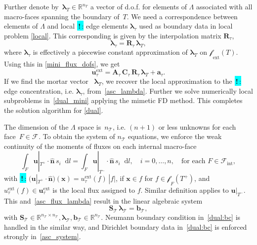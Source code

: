 \documentclass[12pt]{article}
\newcommand{\vect}[1]{\boldsymbol{\mathbf{#1}}}
\newcommand{\bcell}{T}
\newcommand{\bmesh}{{\vect{\mathcal T}}}
\newcommand{\mmesh}{{\vect{\mathcal \tau}}}
\newcommand{\bfaces}[1][]{{\vect{\mathcal F}_{\text{#1}}}}
\newcommand{\mfaces}[1][]{{\vect{\mathcal f}_{\text{#1}}}}
\newcommand{\Rn}[1]{{\mathbb R^{#1}}}
\newcommand{\toDiscuss}[1]{\colorbox{Cyan}{\textbf{\,!\,}:} #1}
\newcommand*\diff{\mathop{}\!\mathrm{d}}
\begin{document}
Further denote by~${{\vect \lambda}_\bcell \in \Rn{n_\bcell}}$ a vector of d.o.f. for elements of $\Lambda$ associated with all macro-faces spanning the boundary of~$\bcell$. We need a correspondence between elements of $\Lambda$ and local \toDiscuss{edge elements} $\vect \lambda_\mmesh$ used as boundary data in local problem \eqref{local}.
This corresponding is given by the interpolation matrix $ \vect R_\mmesh$,
\begin{equation}\label{asc_lambda}
	{\vect \lambda}_\mmesh = \vect R_\mmesh\,{\vect \lambda}_\bcell,
\end{equation}
where ${\vect \lambda}_\mmesh$ is effectively a piecewise constant approximation of ${\vect \lambda}_\bcell$ on $\mfaces_{\text{ext}}(T)$.
Using this in \eqref{mini_flux_dofs}, we get
	\begin{equation}\label{asc_flux_lambda}
		{\vect u}^\text{ext}_\mmesh = \vect A_\mmesh\,\vect C_\mmesh\,\vect R_\mmesh\,{\vect \lambda}_\bcell + {\vect a}_\mmesh.
	\end{equation}
If we find the mortar vector ~${\vect \lambda}_\bcell$, we recover the local approximation to the \toDiscuss{edge} concentration, i.e. ${\vect \lambda}_\mmesh$, from~\eqref{asc_lambda}.
Further we solve numerically local subproblems in~\eqref{dual_mini} applying the mimetic FD method. This completes the solution algorithm for \eqref{dual}.
	
The dimension of the $\Lambda$ space is~$n_\bmesh$, i.e. $(n+1)$ or less unknowns for each face~${F \in \bfaces}$.
To obtain the system of $n_\bmesh$ equations, we enforce the weak continuity of the moments of  fluxes  on each internal macro-face
\begin{equation}\label{flux_cont}
	\int_F \vect u|_{\bcell^+}\cdot\hat{\vect n}\,s_i \diff l = \int_F \vect u|_{\bcell^-}\cdot\hat{\vect n}\,s_i \diff l, \quad i = 0, \dots, n, \quad \text{for each } F \in \bfaces[int],
\end{equation}
with \toDiscuss{$\big(\vect u|_{\bcell^+}\cdot\hat{\vect n}\big)(\vect x) = u^\text{ext}_\mmesh(f)\,|f|$}, if $\vect x \in f$ for $f\in\mfaces_F(T^+)$, and $u^\text{ext}_\mmesh(f) \in \vect u^\text{ext}_\mmesh$ is the local flux assigned to $f$. Similar definition applies to $\vect u|_{\bcell^-}$. 	
This and~\eqref{asc_flux_lambda} result in the linear algebraic system
\begin{equation}\label{asc_system}
	\vect S_\bmesh\,{\vect \lambda}_\bmesh = {\vect b}_\bmesh,
\end{equation}
with	$\vect S_\bmesh \in \Rn{n_\bmesh \times n_\bmesh}, {\vect \lambda}_\bmesh, {\vect b}_\bmesh \in \Rn{n_\bmesh}$.
Neumann boundary condition in~\eqref{dual:bc} is handled in the similar way, and Dirichlet boundary data in~\eqref{dual:bc} is enforced strongly in~\eqref{asc_system}.
	
\end{document}
